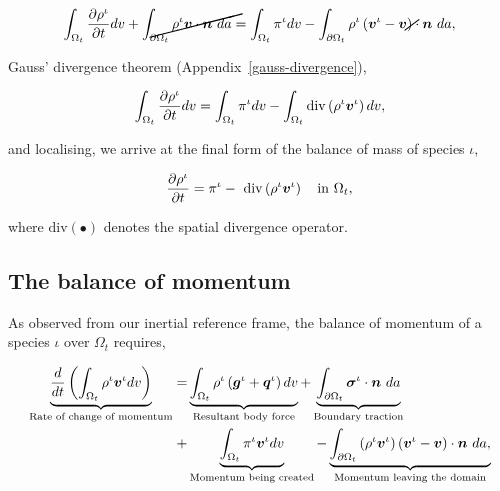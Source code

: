 \begin{equation*}
\int_{\Omega_{t}} \frac{\partial \rho^{\iota}}{\partial t} dv
+ \cancel{\int_{\partial \Omega_{t}} \rho^{\iota} \bv \cdot \bn\ da} =
\int_{\Omega_{t}} \pi^{\iota} dv
- \int_{\partial \Omega_{t}} \rho^{\iota} \left(\bv^{\iota} -
\cancel{\bv}\right) \cdot \bn\ da,
\end{equation*}

Gauss' divergence theorem (Appendix~\ref{gauss-divergence}),

\begin{equation*}
\int_{\Omega_{t}} \frac{\partial \rho^{\iota}}{\partial t} dv =
\int_{\Omega_{t}} \pi^{\iota} dv
- \int_{\Omega_{t}} \mathrm{div} \left( \rho^{\iota} \mbox{\boldmath$ v$}^{\iota}\right) dv, 
\end{equation*}

and localising, we arrive at the final form of the balance of
mass of species $\iota$,

\begin{equation}
\frac{\partial \rho^{\iota}}{\partial t}  =
\pi^{\iota}
-\ \mathrm{div} \left(\rho^{\iota} \mbox{\boldmath$ v$}^{\iota}\right)
\quad \mathrm{in}\ \Omega_{t},
\label{localbalanceofmass}
\end{equation}

where $\mathrm{div} (\bullet)$ denotes the spatial divergence
operator. %



\subsection{The balance of momentum}
\label{eu-balance-of-momentum}

As observed from our inertial reference frame, the balance of
momentum of a species $\iota$ over $\Omega_{t}$ requires,

\begin{equation}
\begin{split}
\underbrace{\frac{d}{dt}\left(\int_{\Omega_{t}} \rho^{\iota}
  \mbox{\boldmath$ v$}^{\iota} dv \right)}_{\text{Rate of change of momentum}}  = 
& \underbrace{\int_{\Omega_{t}} \rho^{\iota} \left(\mbox{\boldmath$ g$}^{\iota} +
  \mbox{\boldmath$ q$}^{\iota}\right) dv}_{\text{Resultant body force}} 
+ \underbrace{\int_{\partial \Omega_{t}}
  \mbox{\boldmath$\sigma$}^{\iota}\cdot\mbox{\boldmath$ n$}\ da}_{\text{Boundary traction}}\\ 
+ & \underbrace{\int_{\Omega_{t}} \pi^{\iota}\mbox{\boldmath$ v$}^{\iota}
  dv}_{\text{Momentum being created}}
- \underbrace{\int_{\partial \Omega_{t}} \left(\rho^{\iota}
  \mbox{\boldmath$ v$}^{\iota} \right) \left(\mbox{\boldmath$ v$}^{\iota} -
\mbox{\boldmath$ v$}\right) \cdot \mbox{\boldmath$ n$}\ da,}_{\text{Momentum leaving the domain}} 
\end{split}
\label{globalbalanceofmomentum}
\end{equation}

